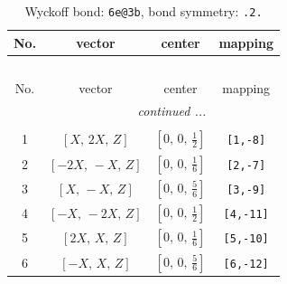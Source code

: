 \documentclass[fleqn,8pt]{jsarticle}
\begin{document}
\renewcommand{\arraystretch}{1.2}
\begin{longtable}{cccc}
\caption{Wyckoff bond: {\tt 6e@3b}, bond symmetry: {\tt .2.}}
 \\
 \hline \hline
No. & vector & center & mapping \\ \hline \endfirsthead

\multicolumn{3}{l}{\tablename\ \thetable{}} \\
 \hline \hline
No. & vector & center & mapping \\ \hline \endhead

 \hline \hline
\multicolumn{3}{r}{\footnotesize\it continued ...} \\ \endfoot

 \hline \hline
\multicolumn{3}{r}{} \\ \endlastfoot

1 & $\left[ X,\, 2 X,\, Z \right]$ & $\left[ 0,\, 0,\, \frac{1}{2} \right]$ & {\tt [1,-8]} \\ \hline
2 & $\left[ - 2 X,\, - X,\, Z \right]$ & $\left[ 0,\, 0,\, \frac{1}{6} \right]$ & {\tt [2,-7]} \\ \hline
3 & $\left[ X,\, - X,\, Z \right]$ & $\left[ 0,\, 0,\, \frac{5}{6} \right]$ & {\tt [3,-9]} \\ \hline
4 & $\left[ - X,\, - 2 X,\, Z \right]$ & $\left[ 0,\, 0,\, \frac{1}{2} \right]$ & {\tt [4,-11]} \\ \hline
5 & $\left[ 2 X,\, X,\, Z \right]$ & $\left[ 0,\, 0,\, \frac{1}{6} \right]$ & {\tt [5,-10]} \\ \hline
6 & $\left[ - X,\, X,\, Z \right]$ & $\left[ 0,\, 0,\, \frac{5}{6} \right]$ & {\tt [6,-12]} \\
\end{longtable}
\renewcommand{\arraystretch}{1.2}
\end{document}
